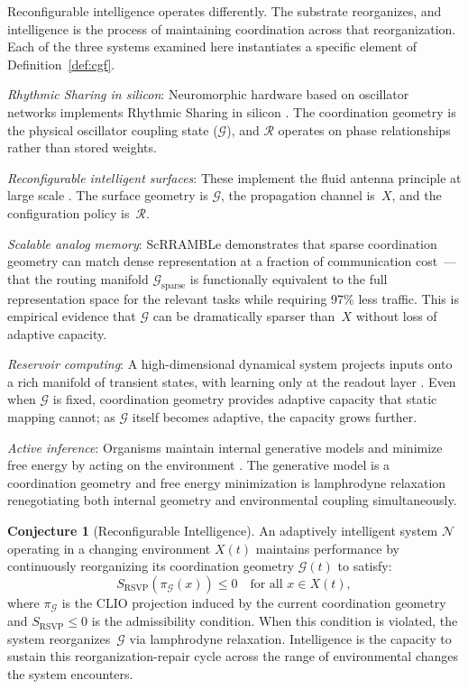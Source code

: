 \documentclass[11pt, a4paper]{article}
\theoremstyle{definition}
\newtheorem{conjecture}{Conjecture}
\theoremstyle{remark}
\begin{document}
Reconfigurable intelligence operates differently. The substrate reorganizes,
and intelligence is the process of maintaining coordination across that
reorganization. Each of the three systems examined here instantiates a
specific element of Definition~\ref{def:cgf}.

\textit{Rhythmic Sharing in silicon}: Neuromorphic hardware based on
oscillator networks implements Rhythmic Sharing in silicon \cite{maass2002,
lukosevicius2009}. The coordination geometry is the physical oscillator
coupling state ($\mathcal{G}$), and $\mathcal{R}$ operates on phase
relationships rather than stored weights.

\textit{Reconfigurable intelligent surfaces}: These implement the fluid
antenna principle at large scale \cite{direnzo2019, basar2019}.
The surface geometry is $\mathcal{G}$, the propagation channel is~$X$,
and the configuration policy is~$\mathcal{R}$.

\textit{Scalable analog memory}: ScRRAMBLe demonstrates that sparse
coordination geometry can match dense representation at a fraction of
communication cost~--- that the routing manifold $\mathcal{G}_{\mathrm{sparse}}$
is functionally equivalent to the full representation space for the relevant
tasks while requiring 97\% less traffic. This is empirical evidence that
$\mathcal{G}$ can be dramatically sparser than~$X$ without loss of adaptive
capacity.

\textit{Reservoir computing}: A high-dimensional dynamical system projects
inputs onto a rich manifold of transient states, with learning only at the
readout layer \cite{maass2002, jaeger2001, verstraeten2007}. Even when
$\mathcal{G}$ is fixed, coordination geometry provides adaptive capacity
that static mapping cannot; as $\mathcal{G}$ itself becomes adaptive, the
capacity grows further.

\textit{Active inference}: Organisms maintain internal generative models and
minimize free energy by acting on the environment \cite{friston2010}. The
generative model is a coordination geometry and free energy minimization is
lamphrodyne relaxation renegotiating both internal geometry and environmental
coupling simultaneously.

\begin{conjecture}[Reconfigurable Intelligence]
An adaptively intelligent system $\mathcal{N}$ operating in a changing
environment $X(t)$ maintains performance by continuously reorganizing its
coordination geometry $\mathcal{G}(t)$ to satisfy:
\[
S_{\mathrm{RSVP}}(\pi_{\mathcal{G}}(x)) \leq 0 \quad
\text{for all } x \in X(t),
\]
where $\pi_{\mathcal{G}}$ is the CLIO projection induced by the current
coordination geometry and $S_{\mathrm{RSVP}} \leq 0$ is the admissibility
condition. When this condition is violated, the system reorganizes~$\mathcal{G}$
via lamphrodyne relaxation. Intelligence is the capacity to sustain this
reorganization-repair cycle across the range of environmental changes the
system encounters.
\end{conjecture}
\end{document}
